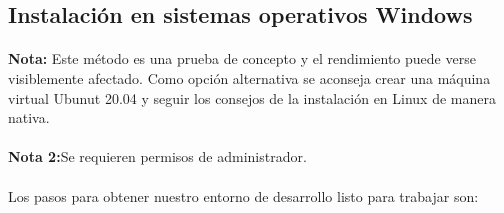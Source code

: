 \subsection{Instalación en sistemas operativos Windows}

\paragraph{}\textbf{Nota:} Este método es una prueba de concepto y el rendimiento puede
verse visiblemente afectado. Como opción alternativa se aconseja crear una máquina
virtual Ubunut 20.04 y seguir los consejos de la instalación en Linux de manera nativa.

\paragraph{}\textbf{Nota 2:}Se requieren permisos de administrador.

\paragraph{}Los pasos para obtener nuestro entorno de desarrollo listo para trabajar son:

